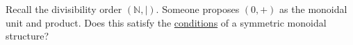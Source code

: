 Recall the divisibility order $(\mathbb{N}, |)$. Someone proposes $(0,+)$ as the monoidal unit and product. Does this satisfy the \hyperref[D2.2]{conditions} of a symmetric monoidal structure?